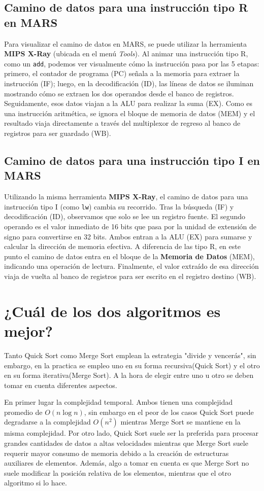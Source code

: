 \documentclass[12pt, a4paper]{article}
\begin{document}
        \subsection{Camino de datos para una instrucción tipo R en MARS}
            Para visualizar el camino de datos en MARS, se puede utilizar la herramienta \textbf{MIPS X-Ray} (ubicada en el menú \textit{Tools}). Al animar una instrucción tipo R, como un \lstinline|add|, podemos ver visualmente cómo la instrucción pasa por las 5 etapas: primero, el contador de programa (PC) señala a la memoria para extraer la instrucción (IF); luego, en la decodificación (ID), las líneas de datos se iluminan mostrando cómo se extraen los dos operandos desde el banco de registros. Seguidamente, esos datos viajan a la ALU para realizar la suma (EX). Como es una instrucción aritmética, se ignora el bloque de memoria de datos (MEM) y el resultado viaja directamente a través del multiplexor de regreso al banco de registros para ser guardado (WB).

        \subsection{Camino de datos para una instrucción tipo I en MARS}
            Utilizando la misma herramienta \textbf{MIPS X-Ray}, el camino de datos para una instrucción tipo I (como \lstinline|lw|) cambia su recorrido. Tras la búsqueda (IF) y decodificación (ID), observamos que solo se lee un registro fuente. El segundo operando es el valor inmediato de 16 bits que pasa por la unidad de extensión de signo para convertirse en 32 bits. Ambos entran a la ALU (EX) para sumarse y calcular la dirección de memoria efectiva. A diferencia de las tipo R, en este punto el camino de datos entra en el bloque de la \textbf{Memoria de Datos} (MEM), indicando una operación de lectura. Finalmente, el valor extraído de esa dirección viaja de vuelta al banco de registros para ser escrito en el registro destino (WB).
    \section{¿Cuál de los dos algoritmos es mejor?}
            Tanto Quick Sort como Merge Sort emplean la estrategia "divide y vencerás", sin embargo, en la practica se empleo uno en su forma recursiva(Quick Sort) y el otro en su forma iterativa(Merge Sort). A la hora de elegir entre uno u otro se deben tomar en cuenta diferentes aspectos. 

            En primer lugar la complejidad temporal. Ambos tienen una complejidad promedio de $O(n\log n)$, sin embargo en el peor de los casos Quick Sort puede degradarse a la complejidad $O(n^2)$ mientras Merge Sort se mantiene en la misma complejidad. Por otro lado, Quick Sort suele ser la preferida para procesar grandes cantidades de datos a altas velocidades mientras que Merge Sort suele requerir mayor consumo de memoria debido a la creación de estructuras auxiliares de elementos. Además, algo a tomar en cuenta es que Merge Sort no suele modificar la posición relativa de los elementos, mientras que el otro algoritmo si lo hace.
\end{document}
